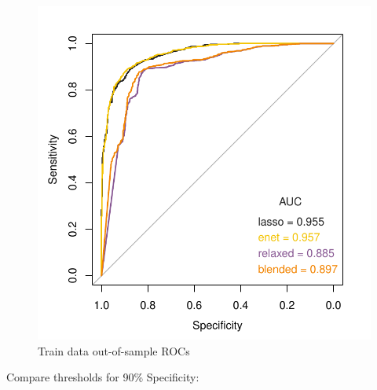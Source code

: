 \documentclass[
]{book}
\begin{document}
\begin{figure}
\centering
\includegraphics{Static/figures/brcaRna-glmnetFit-trainROC-1.pdf}
\caption{\label{fig:brcaRna-glmnetFit-trainROC}Train data out-of-sample ROCs}
\end{figure}

Compare thresholds for 90\% Specificity:
\end{document}
